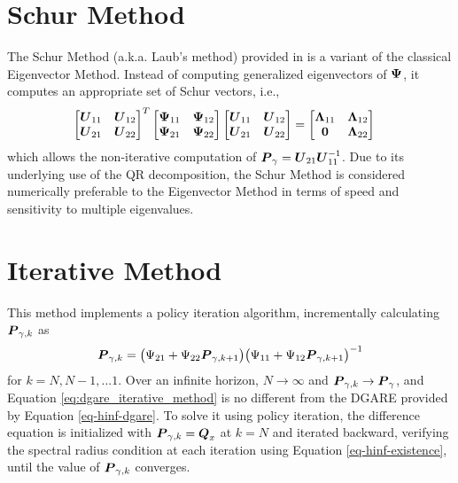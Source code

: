 \section{Schur Method}
\label{appendix:numerical:schur}
The Schur Method (a.k.a. Laub's method) provided in \cite{laub1979schur} is a variant of the classical Eigenvector Method.  Instead of computing generalized eigenvectors of $\vb*{\Psi}$, it computes an appropriate set of Schur vectors, i.e.,
\begin{equation}
\begin{aligned}
	\begin{bmatrix}
		\vb*{U}_{11} & \vb*{U}_{12}\\
		\vb*{U}_{21} & \vb*{U}_{22}\\
	\end{bmatrix}^{T}
	\begin{bmatrix}
		\vb*{\Psi}_{11} & \vb*{\Psi}_{12}\\
		\vb*{\Psi}_{21} & \vb*{\Psi}_{22}\\
	\end{bmatrix}
	\begin{bmatrix}
		\vb*{U}_{11} & \vb*{U}_{12}\\
		\vb*{U}_{21} & \vb*{U}_{22}\\
	\end{bmatrix} &=
	\begin{bmatrix}
		\vb*{\Lambda}_{11} & \vb*{\Lambda}_{12}\\
		\vb*{0} & \vb*{\Lambda}_{22}\\
	\end{bmatrix}
\end{aligned}
\end{equation}
which allows the non-iterative computation of $\vb*{P}_{\gamma} = \vb*{U}_{21}\vb*{U}_{11}^{-1}$.  Due to its underlying use of the QR decomposition, the Schur Method is considered numerically preferable to the Eigenvector Method in terms of speed and sensitivity to multiple eigenvalues.

\section{Iterative Method}
\label{appendix:numerical:iterative}
This method implements a policy iteration algorithm, incrementally calculating $\vb*{P}_{\gamma,k}$ as
\begin{equation}
\label{eq:dgare_iterative_method}
\begin{aligned}
	\vb*{P}_{\gamma,k} &= \big{(} \Psi_{21} + \Psi_{22}\vb*{P}_{\gamma,k+1} \big{)}
		\big{(} \Psi_{11} + \Psi_{12}\vb*{P}_{\gamma,k+1} \big{)}^{-1}\\
\end{aligned}
\end{equation}
for $k = N, N-1, ... 1$.  Over an infinite horizon, $N \rightarrow \infty$ and  $\vb*{P}_{\gamma,k} \rightarrow \vb*{P}_{\gamma}$, and Equation \eqref{eq:dgare_iterative_method} is no different from the DGARE provided by Equation \eqref{eq-hinf-dgare}.  To solve it using policy iteration, the difference equation is initialized with $\vb*{P}_{\gamma,k} = \vb*{Q}_{x}$ at $k = N$ and iterated backward, verifying the spectral radius condition at each iteration using Equation \eqref{eq-hinf-existence}, until the value of $\vb*{P}_{\gamma,k}$ converges.
